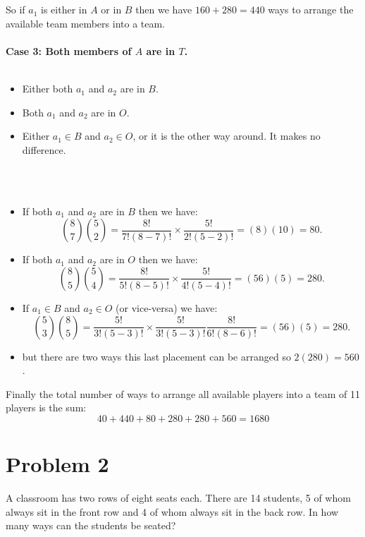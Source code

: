 \documentclass{article}
\begin{document}
     \\ \\ 
     So if $a_{1}$ is either in ${A}$ or in ${B}$ then we have $160+280 = 440$ ways to arrange the available team members into a team. 
     \\ \\
     \textbf{Case 3: Both members of ${A}$ are in ${T}$.} 
     \\ \\
     \begin{itemize}
         \item Either both $a_{1}$ and $a_{2}$ are in ${B}$.
         \item Both $a_{1}$ and $a_{2}$ are in ${O}$.
         \item Either $a_{1} \in {B}$ and $a_{2} \in {O}$, or it is the other way around. It makes no difference. 
     \end{itemize}
     \\ \\
     \begin{itemize}
         \item If both $a_{1}$ and $a_{2}$ are in ${B}$ then we have: \\
         $$\binom{8}{7} \binom{5}{2} = \frac{8!}{7!(8-7)!} \times \frac{5!}{2!(5-2)!} = (8)(10) = 80.$$
         \item If both  $a_{1}$ and $a_{2}$ are in ${O}$ then we have: \\
         $$\binom{8}{5} \binom{5}{4} = \frac{8!}{5!(8-5)!} \times \frac{5!}{4!(5-4)!} = (56)(5) = 280.$$
         \item If $a_{1} \in {B}$ and $a_{2} \in {O}$ (or vice-versa) we have: \\
         $$\binom{5}{3} \binom{8}{5} = \frac{5!}{3!(5-3)!} \times \frac{5!}{3!(5-3)!} \frac{8!}{6!(8-6)!} = (56)(5) = 280.$$
         \item but there are two ways this last placement can be arranged so $2(280) = 560$. 
     \end{itemize}
     Finally the total number of ways to arrange all available players into a team of 11 players is the sum: \\
     $$40 + 440 + 80 + 280 + 280 + 560 = 1680$$
     
\pagebreak

\section*{Problem 2}
A classroom has two rows of eight seats each. There are 14 students, 5 of whom always sit in the front row and 4 of whom always sit in the back row. In how many ways  can the students be seated?
\end{document}
